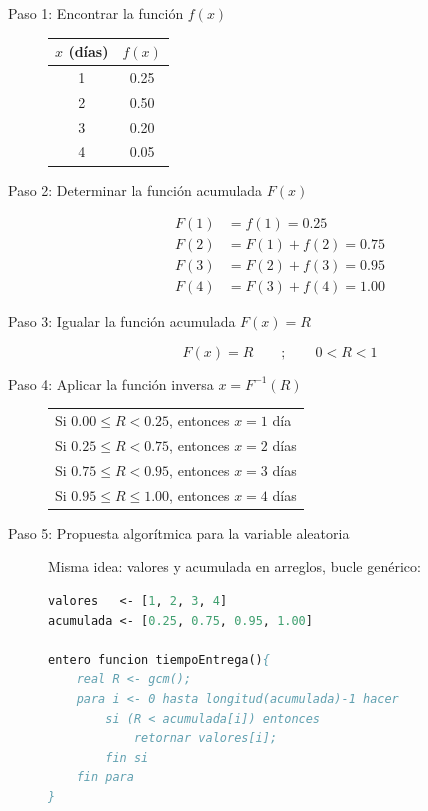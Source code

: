 \documentclass[12pt, a4paper]{article}
\begin{document}
\begin{description}
    \item[Paso 1: Encontrar la función $f(x)$]

    \begin{center}
    \begin{tabular}{cc}
    \toprule
    $x$ (días) & $f(x)$ \\
    \midrule
    1 & 0.25 \\
    2 & 0.50 \\
    3 & 0.20 \\
    4 & 0.05 \\
    \bottomrule
    \end{tabular}
    \end{center}

    \item[Paso 2: Determinar la función acumulada $F(x)$]

    \begin{align*}
    F(1) &= f(1) = 0.25 \\
    F(2) &= F(1)+f(2) = 0.75 \\
    F(3) &= F(2)+f(3) = 0.95 \\
    F(4) &= F(3)+f(4) = 1.00
    \end{align*}

    \item[Paso 3: Igualar la función acumulada $F(x) = R$]

    $$ F(x)=R \qquad ; \qquad 0 < R < 1 $$

    \item[Paso 4: Aplicar la función inversa $x=F^{-1}(R)$]

    \begin{center}
    \begin{tabular}{l}
    Si $0.00 \leq R < 0.25$, entonces $x=1$ día \\
    Si $0.25 \leq R < 0.75$, entonces $x=2$ días \\
    Si $0.75 \leq R < 0.95$, entonces $x=3$ días \\
    Si $0.95 \leq R \leq 1.00$, entonces $x=4$ días \\
    \end{tabular}
    \end{center}

    \item[Paso 5: Propuesta algorítmica para la variable aleatoria]

    Misma idea: valores y acumulada en arreglos, bucle genérico:

    \begin{lstlisting}[caption={tiempoEntrega()}, language=Pascal]
valores   <- [1, 2, 3, 4]
acumulada <- [0.25, 0.75, 0.95, 1.00]

entero funcion tiempoEntrega(){
    real R <- gcm();
    para i <- 0 hasta longitud(acumulada)-1 hacer
        si (R < acumulada[i]) entonces
            retornar valores[i];
        fin si
    fin para
}
    \end{lstlisting}
\end{description}
\end{document}
